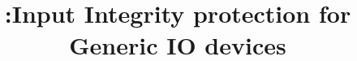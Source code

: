 

\newif\ifpaper
\papertrue


\newif\ifdesperatetime

\graphicspath{{images/}}


\title{\name:Input Integrity protection for Generic IO devices}

\iffalse
\author{\IEEEauthorblockN{Aritra Dhar}
\IEEEauthorblockA{ETH Z{\"u}rich\\
aritra.dhar@inf.ethz.ch}
}
\fi
\maketitle
\begin{abstract}

\end{abstract}

\IEEEpeerreviewmaketitle








%  
%


